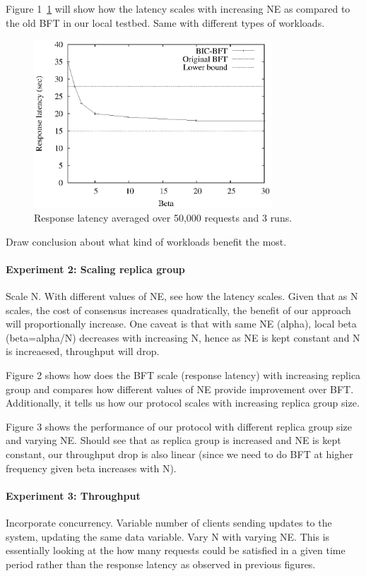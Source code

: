 \documentclass[twocolumn,10pt]{article}
\begin{document}
{Figure 1~\ref{fig:latency-no-concurrency} will show how the latency scales with increasing NE as compared to the 
old BFT in our local testbed. Same with different types of workloads.

\begin{figure}
\centering
\includegraphics[width=3.5in]{Figures/Latency-50k-1client.ps}
\caption{Response latency averaged over 50,000 requests and 3 runs.}
\label{fig:latency-no-concurrency}
\end{figure}


Draw conclusion about what kind of workloads benefit the most.

\paragraph{Experiment 2: Scaling replica group} Scale N. With different values of NE, see
how the latency scales. Given that as N scales, the cost of consensus increases
quadratically, the benefit of our approach will proportionally increase. 
One caveat is that with same NE (alpha), local beta (beta=alpha/N) decreases with increasing N, 
hence as NE is kept constant and N is increaesed, throughput will drop.

Figure 2 shows how does the BFT scale (response latency) with increasing replica group and compares
how different values of NE provide improvement over BFT. Additionally, it tells
us how our protocol scales with increasing replica group size. 

Figure 3 shows the performance of our protocol with different replica group size and
varying NE. Should see that as replica group is increased and NE is kept constant, our
throughput drop is also linear (since we need to do BFT at higher frequency given beta
increases with N). 

\paragraph{Experiment 3: Throughput} Incorporate concurrency. 
Variable number of clients sending updates to the system, updating the same 
data variable. Vary N with varying NE. This is essentially looking at the
how many requests could be satisfied in a given time period rather than the response
latency as observed in previous figures.

}
\end{document}
